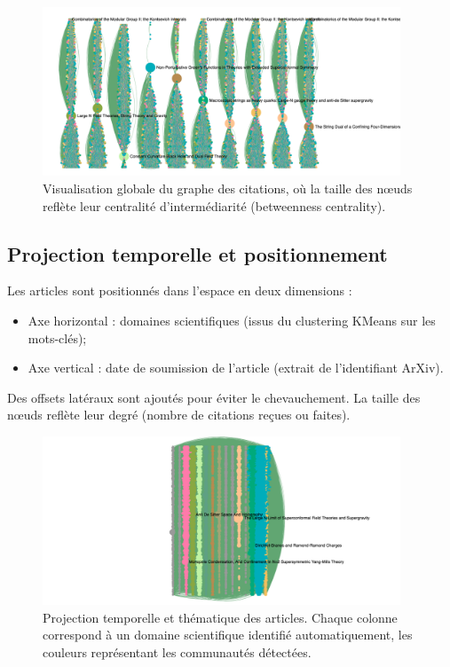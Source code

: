 \documentclass[12pt]{article}
\begin{document}
\begin{figure}[H]
    \centering
    \includegraphics[width=0.95\textwidth]{pictures/graph.png}
    \caption{Visualisation globale du graphe des citations, où la taille des nœuds reflète leur centralité d’intermédiarité (betweenness centrality).}
\end{figure}

\subsection{Projection temporelle et positionnement}

Les articles sont positionnés dans l'espace en deux dimensions :
\begin{itemize}
    \item Axe horizontal : domaines scientifiques (issus du clustering KMeans sur les mots-clés);
    \item Axe vertical : date de soumission de l’article (extrait de l’identifiant ArXiv).
\end{itemize}

Des offsets latéraux sont ajoutés pour éviter le chevauchement. La taille des nœuds reflète leur degré (nombre de citations reçues ou faites).

\begin{figure}[H]
    \centering
    \includegraphics[width=0.95\textwidth]{pictures/domain.png}
    \caption{Projection temporelle et thématique des articles. Chaque colonne correspond à un domaine scientifique identifié automatiquement, les couleurs représentant les communautés détectées.}
\end{figure}
\end{document}

